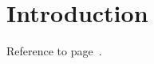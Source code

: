 \documentclass[draft]{ltugboat}
\begin{document}
\tableofcontents
\section{Introduction}
\label{intro} Reference to page~\pageref{intro}.
\end{document}
